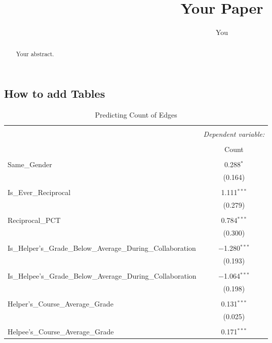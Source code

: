 \documentclass[a4paper]{article}
\title{Your Paper}
\author{You}
\begin{document}
\maketitle

\begin{abstract}
Your abstract.
\end{abstract}

\subsection{How to add Tables}

\begin{table}[!htbp] \centering 
  \caption{Predicting Count of Edges} 
  \label{} 
\begin{tabular}{@{\extracolsep{5pt}}lc} 
\\[-1.8ex]\hline 
\hline \\[-1.8ex] 
 & \multicolumn{1}{c}{\textit{Dependent variable:}} \\ 
\cline{2-2} 
\\[-1.8ex] & Count \\ 
\hline \\[-1.8ex] 
 Same\_Gender & 0.288$^{*}$ \\ 
  & (0.164) \\ 
  & \\ 
 Is\_Ever\_Reciprocal & 1.111$^{***}$ \\ 
  & (0.279) \\ 
  & \\ 
 Reciprocal\_PCT & 0.784$^{***}$ \\ 
  & (0.300) \\ 
  & \\ 
 Is\_Helper's\_Grade\_Below\_Average\_During\_Collaboration  & $-$1.280$^{***}$ \\ 
  & (0.193) \\ 
  & \\ 
Is\_Helpee's\_Grade\_Below\_Average\_During\_Collaboration & $-$1.064$^{***}$ \\ 
  & (0.198) \\ 
  & \\ 
Helper's\_Course\_Average\_Grade & 0.131$^{***}$ \\ 
  & (0.025) \\ 
  & \\ 
Helpee's\_Course\_Average\_Grade & 0.171$^{***}$ \\ 

\end{tabular}
\end{table}
\end{document}
